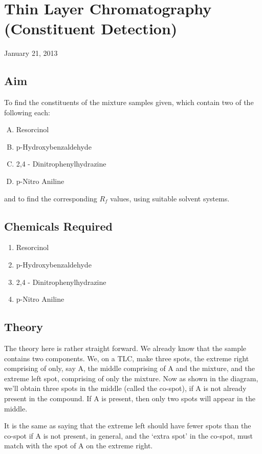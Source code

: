 \chapter{Thin Layer Chromatography (Constituent Detection)}
\begin{flushright}
January 21, 2013
\end{flushright}
\section{Aim}
To find the constituents of the mixture samples given, which contain two of the following each: 
\begin{enumerate}[A)]
	\item Resorcinol
	\item p-Hydroxybenzaldehyde
	\item 2,4 - Dinitrophenylhydrazine
	\item p-Nitro Aniline
\end{enumerate}
and to find the corresponding $R_f$ values, using suitable solvent systems.

\section {Chemicals Required}
	\begin{enumerate}
		\item Resorcinol
		\item p-Hydroxybenzaldehyde
		\item 2,4 - Dinitrophenylhydrazine
		\item p-Nitro Aniline
	\end{enumerate}

\section{Theory}
	The theory here is rather straight forward. We already know that the sample contains two components. We, on a TLC, make three spots, the extreme right comprising of only, say A, the middle comprising of A and the mixture, and the extreme left spot, comprising of only the mixture. Now as shown in the diagram, we'll obtain three spots in the middle (called the co-spot), if A is not already present in the compound. If A is present, then only two spots will appear in the middle.\par
	It is the same as saying that the extreme left should have fewer spots than the co-spot if A is not present, in general, and the `extra spot' in the co-spot, must match with the spot of A on the extreme right.

